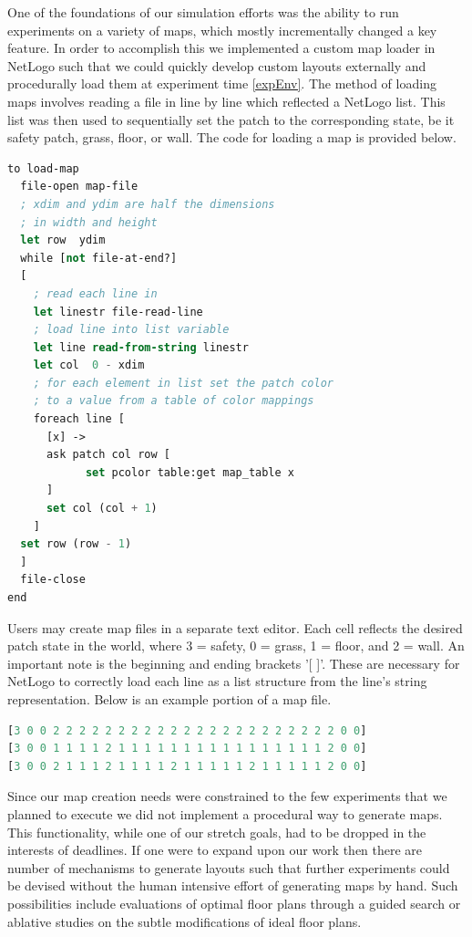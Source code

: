 \documentclass[12pt,letterpaper]{article}
\begin{document}
One of the foundations of our simulation efforts was the ability to run experiments on a variety of maps, which mostly incrementally changed a key feature.  In order to accomplish this we implemented a custom map loader in NetLogo such that we could quickly develop custom layouts externally and procedurally load them at experiment time \ref{expEnv}.  The method of loading maps involves reading a file in line by  line which reflected a NetLogo list.  This list was then used to sequentially set the patch to the corresponding state, be it safety patch, grass, floor, or wall.  The code for loading a map is provided below.


\begin{minipage}{\linewidth}
\begin{lstlisting}[language=lisp, caption={Map loading procedure in NetLogo},captionpos=b, frame=single]
to load-map
  file-open map-file
  ; xdim and ydim are half the dimensions
  ; in width and height
  let row  ydim
  while [not file-at-end?]
  [
    ; read each line in	
    let linestr file-read-line
    ; load line into list variable
    let line read-from-string linestr
    let col  0 - xdim
    ; for each element in list set the patch color 
    ; to a value from a table of color mappings
    foreach line [      
      [x] ->
      ask patch col row [ 
            set pcolor table:get map_table x 
      ]
      set col (col + 1)
    ]
  set row (row - 1)
  ]
  file-close
end
\end{lstlisting}
\end{minipage}

Users may create map files in a separate text editor. Each cell reflects the desired patch state in the world, where 3 = safety, 0 = grass, 1 = floor, and 2 = wall. An important note is the beginning and ending brackets '[ ]'.  These are necessary for NetLogo to correctly load each line as a list structure from the line's string representation.  Below is an example portion of a map file.  

\begin{lstlisting}[language=lisp, caption={Example map file, 3 rows},captionpos=b, frame=single]
[3 0 0 2 2 2 2 2 2 2 2 2 2 2 2 2 2 2 2 2 2 2 2 2 2 0 0]
[3 0 0 1 1 1 1 2 1 1 1 1 1 1 1 1 1 1 1 1 1 1 1 1 2 0 0]
[3 0 0 2 1 1 1 2 1 1 1 1 2 1 1 1 1 1 2 1 1 1 1 1 2 0 0]
\end{lstlisting}

Since our map creation needs were constrained to the few experiments that we planned to execute we did not implement a procedural way to generate maps.  This functionality, while one of our stretch goals, had to be dropped in the interests of deadlines.  If one were to expand upon our work then there are number of mechanisms to generate layouts \cite{mirahmadiNovelAlgorithmRealtime2012} such that further experiments could be devised without the human intensive effort of generating maps by hand.  Such possibilities include evaluations of optimal floor plans through a guided search or ablative studies on the subtle modifications of ideal floor plans.
\end{document}
